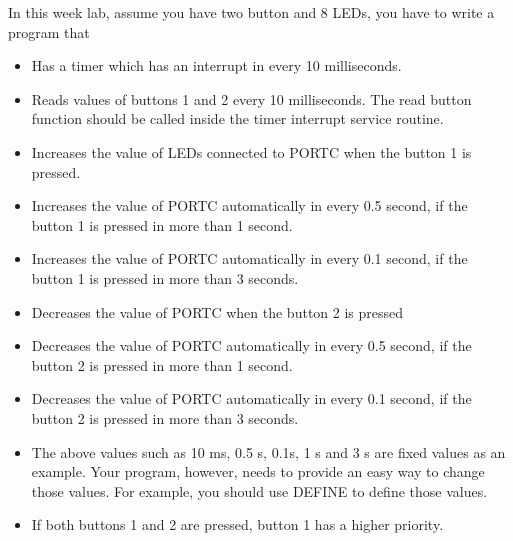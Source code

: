 In this week lab, assume you have two button and 8 LEDs, you have to write a program that
\begin{itemize}
    \item Has a timer which has an interrupt in every 10 milliseconds.  
    \item  Reads values of buttons 1 and 2 every 10 milliseconds. The read button function should be called inside the timer interrupt service routine.
    \item Increases the value of LEDs connected to PORTC when the button 1 is pressed.
    \item Increases the value of PORTC automatically in every 0.5 second, if the button 1 is pressed in more than 1 second.
    \item Increases the value of PORTC automatically in every 0.1 second, if the button 1 is pressed in more than 3 seconds.
    \item Decreases the value of PORTC when the button 2 is pressed
    \item Decreases the value of PORTC automatically in every 0.5 second, if the button 2 is pressed in more than 1 second.
    \item Decreases the value of PORTC automatically in every 0.1 second, if the button 2 is pressed in more than 3 seconds.
    \item The above values such as 10 ms, 0.5 s, 0.1s, 1 s and 3 s are fixed values as an example. Your program, however, needs to provide an easy way to change those values. For example, you should use DEFINE to define those values.
    \item If both buttons 1 and 2 are pressed, button 1 has a higher priority.
\end{itemize}


